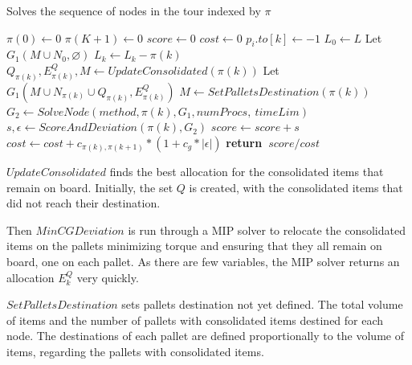 \documentclass[preprint,authoryear]{elsarticle}
\renewcommand{\Return}{\State \bf {return}~}
\begin{document}
\begin{algorithm}[H]
	\caption{ Solves the sequence of nodes in the tour indexed by $\pi$ }  \label{alg:tour}
	
	\begin{algorithmic}[1]
		
		
		\State $\pi(0) \gets 0$ \label{tour:pi1}
		\State $\pi(K+1) \gets 0$ \label{tour:pi2}
		\State $score \gets 0$ \label{tour:score}
		\State $cost \gets 0$ \label{tour:cost}
		 \label{tour:loop1}		
				\State $p_i.to[k] \gets -1$ \label{tour:-1}
			\EndFor	
				\State $L_0 \gets L$
				\State Let $G_1(M \cup N_0, \varnothing)$ \label{tour:g11}
			\Else
				\State $L_k \gets L_k - \pi(k)$  \label{tour:lk1}			
				\State $Q_{\pi(k)}, E^Q_{\pi(k)}, M \gets UpdateConsolidated(\pi(k))$ \label{tour:dest}			
				\State Let $G_1(M \cup N_{\pi(k)} \cup Q_{\pi(k)}, E^Q_{\pi(k)})$ \label{tour:g12}
			\EndIf  \label{tour:lk2}	
			\State $M \gets SetPalletsDestination( \pi(k) )$ \label{tour:dest2}		
			\State $G_2 \gets SolveNode(method, \pi(k), G_1, numProcs,\ timeLim)$ \label{tour:node}
			\State $s, \epsilon \gets ScoreAndDeviation(\pi(k), G_2)$ \label{tour:analyse}
			\State $score \gets score + s$ \label{tour:score2}
			\State $cost \gets cost + c_{\pi(k),\pi(k+1)} * (1 + c_g * |\epsilon|)$ \label{tour:cost2} 
		\EndFor  \label{tour:loop2}
		\Return $score / cost$ \label{tour:f}
		
		\EndProcedure
		
	\end{algorithmic}
\end{algorithm}

$UpdateConsolidated$ finds the best allocation for the consolidated items that remain on board. Initially, the set $Q$ is created, with the consolidated items that did not reach their destination.

Then $MinCGDeviation$ is run through a MIP solver to relocate the consolidated items on the pallets minimizing torque and ensuring that they all remain on board, one on each pallet. As there are few variables, the MIP solver returns an allocation $E^Q_k$ very quickly.

$SetPalletsDestination$ sets pallets destination not yet defined. The total volume of items and the number of pallets with consolidated items destined for each node. The destinations of each pallet are defined proportionally to the volume of items, regarding the pallets with consolidated items.
\end{document}
